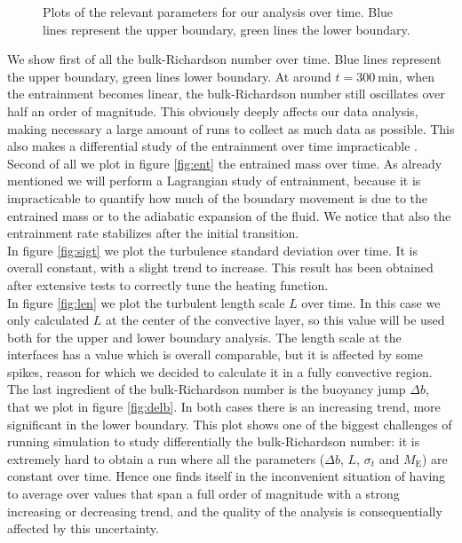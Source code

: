 \begin{figure}[t!]
      \hfill
	\caption{Plots of the relevant parameters for our analysis over time. Blue lines represent the upper boundary, green lines the lower boundary.}
	  \label{fig:2dsingle}
  \end{figure}
We show first of all the bulk-Richardson number over time. Blue lines represent the upper boundary, green lines lower boundary. At around $t=\mathrm{300 \ min}$, when the entrainment becomes linear, the bulk-Richardson number still oscillates over half an order of magnitude. This obviously deeply affects our data analysis, making necessary a large amount of runs to collect as much data as possible. This also makes a differential study of the entrainment over time impracticable . \\
Second of all we plot in figure \ref{fig:ent} the entrained mass over time. As already mentioned we will perform a Lagrangian study of entrainment, because it is impracticable to quantify how much of the boundary movement is due to the entrained mass or to the adiabatic expansion of the fluid. We notice that also the entrainment rate stabilizes after the initial transition. \\
  In figure \ref{fig:sigt} we plot the turbulence standard deviation over time. It is overall constant, with a slight trend to increase. This result has been obtained after extensive tests to correctly tune the heating function.\\
  In figure \ref{fig:len} we plot the turbulent length scale $L$ over time. In this case we only calculated $L$ at the center of the convective layer, so this value will be used both for the upper and lower boundary analysis. The length scale at the interfaces has a value which is overall comparable, but it is affected by some spikes, reason for which we decided to calculate it in a fully convective region.\\ 
  The last ingredient of the bulk-Richardson number is the buoyancy jump $\Delta b$, that we plot in figure \ref{fig:delb}. In both cases there is an increasing trend, more significant in the lower boundary. This plot shows one of the biggest challenges of running simulation to study differentially the bulk-Richardson number: it is extremely hard to obtain a run where all the parameters ($\Delta b$, $L$, $\sigma_t$ and $M_{\mathrm{E}}$) are constant over time. Hence one finds itself in the inconvenient situation of having to average over values that span a full order of magnitude with a strong increasing or decreasing trend, and the quality of the analysis is consequentially affected by this uncertainty.\\
